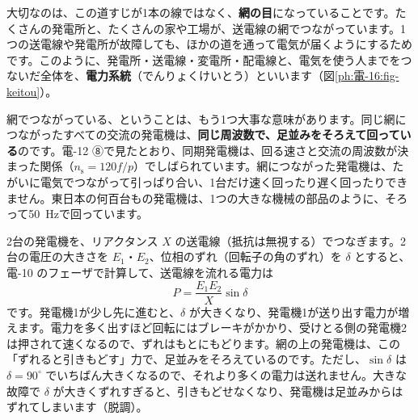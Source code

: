大切なのは、この道すじが1本の線ではなく、\textbf{網の目}になっていることです。たくさんの発電所と、たくさんの家や工場が、送電線の網でつながっています。1つの送電線や発電所が故障しても、ほかの道を通って電気が届くようにするためです。このように、発電所・送電線・変電所・配電線と、電気を使う人までをつないだ全体を、\textbf{電力系統}（でんりょくけいとう）といいます（図\ref{ph:電-16:fig-keitou}）。
\begin{bkfigure}
\label{ph:電-16:fig-keitou}
\end{bkfigure}

網でつながっている、ということは、もう1つ大事な意味があります。同じ網につながったすべての交流の発電機は、\textbf{同じ周波数で、足並みをそろえて回っている}のです。電-12 ⑧で見たとおり、同期発電機は、回る速さと交流の周波数が決まった関係（$n_{\mathrm s}=120f/p$）でしばられています。網につながった発電機は、たがいに電気でつながって引っぱり合い、1台だけ速く回ったり遅く回ったりできません。東日本の何百台もの発電機は、1つの大きな機械の部品のように、そろって\qty{50}{Hz}で回っています。

\begin{motto}[5]
2台の発電機を、リアクタンス $X$ の送電線（抵抗は無視する）でつなぎます。2台の電圧の大きさを $E_1$・$E_2$、位相のずれ（回転子の角のずれ）を $\delta$ とすると、電-10 のフェーザで計算して、送電線を流れる電力は
\[P=\frac{E_1E_2}{X}\sin\delta\]
です。発電機1が少し先に進むと、$\delta$ が大きくなり、発電機1が送り出す電力が増えます。電力を多く出すほど回転にはブレーキがかかり、受けとる側の発電機2は押されて速くなるので、ずれはもとにもどります。網の上の発電機は、この「ずれると引きもどす」力で、足並みをそろえているのです。ただし、$\sin\delta$ は $\delta=90^\circ$ でいちばん大きくなるので、それより多くの電力は送れません。大きな故障で $\delta$ が大きくずれすぎると、引きもどせなくなり、発電機は足並みからはずれてしまいます（脱調）。
\end{motto}

